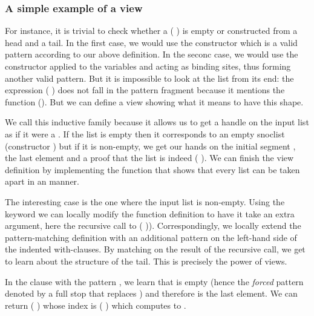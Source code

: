 
\subsubsection{A simple example of a view}

For instance, it is trivial to check whether a ( )
is empty or constructed from a head and a tail.
%
In the first case, we would use the constructor  which is a valid
pattern according to our above definition.
%
In the seconc case, we would use the constructor \IdrisData{(::)} applied to the
variables  and  acting as binding sites, thus
forming another valid pattern.
%
But it is impossible to look at the list from its end: the expression
( \IdrisFunction{++} \IdrisData{[}\IdrisData{]})
does not fall in the pattern fragment because it mentions the function (\IdrisFunction{++}).
But we can define a view showing what it means to have this shape.


We call this inductive family  because it allows us to get
a handle on the input list as if it were a . If the list is
empty then it corresponds to an empty snoclist (constructor )
but if it is non-empty, we get our hands on the initial segment ,
the last element  and a proof that the list is indeed
( \IdrisFunction{++} \IdrisData{[}\IdrisData{]}).
%
We can finish the view definition by implementing the function 
that shows that every list  can be taken apart in an 
manner.


The interesting case is the one where the input list is non-empty.
%
Using the  keyword we can locally modify the function
definition to have it take an extra argument, here the recursive call to
( )).
%
Correspondingly, we locally extend the pattern-matching definition with
an additional pattern on the left-hand side of the indented with-clauses.
%
By matching on the result of the recursive call, we get to learn about the
structure of the tail. This is precisely the power of views.

In the clause with the pattern \IdrisData{[<]}, we learn that  is empty
(hence the \emph{forced} pattern denoted by a full stop
\IdrisData{[]}\IdrisKeyword{)} that replaces )
and therefore  is the last element.
%
We can return (\IdrisData{[]} \IdrisData{:<} ) whose index is
(\IdrisData{[]} \IdrisFunction{++} \IdrisData{[}\IdrisData{]})
which computes to \IdrisData{[}\IdrisData{]}.

